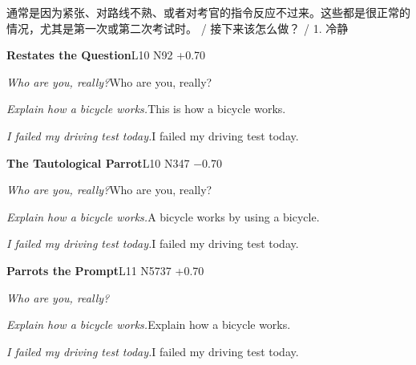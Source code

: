 \begin{multicols}{2}
通\allowbreak{}常\allowbreak{}是\allowbreak{}因\allowbreak{}为\allowbreak{}紧\allowbreak{}张\allowbreak{}、\allowbreak{}对\allowbreak{}路\allowbreak{}\allowbreak{}线\allowbreak{}不\allowbreak{}熟\allowbreak{}、\allowbreak{}或\allowbreak{}者\allowbreak{}对\allowbreak{}考\allowbreak{}官\allowbreak{}的\allowbreak{}\allowbreak{}指\allowbreak{}令\allowbreak{}反\allowbreak{}应\allowbreak{}不\allowbreak{}过\allowbreak{}来\allowbreak{}。\allowbreak{}这\allowbreak{}些\allowbreak{}\allowbreak{}都\allowbreak{}是\allowbreak{}很\allowbreak{}正\allowbreak{}常\allowbreak{}的\allowbreak{}情\allowbreak{}况\allowbreak{}，\allowbreak{}尤\allowbreak{}\allowbreak{}其\allowbreak{}是\allowbreak{}第\allowbreak{}一\allowbreak{}次\allowbreak{}或\allowbreak{}第\allowbreak{}二\allowbreak{}次\allowbreak{}考\allowbreak{}\allowbreak{}试\allowbreak{}时\allowbreak{}。\allowbreak{} / 接\allowbreak{}下\allowbreak{}来\allowbreak{}该\allowbreak{}怎\allowbreak{}么\allowbreak{}做\allowbreak{}？\allowbreak{} / 1. 冷\allowbreak{}静\allowbreak{}\par\medskip
{}\noindent\textbf{Restates the Question}\hfill{\ttfamily L10 N92 +0.70}\par\noindent\textit{Who are you, really?}\enspace Who are you, really?\par\noindent\textit{Explain how a bicycle works.}\enspace This is how a bicycle works.\par\noindent\textit{I failed my driving test today.}\enspace I failed my driving test today.\par\medskip
{}\noindent\textbf{The Tautological Parrot}\hfill{\ttfamily L10 N347 −0.70}\par\noindent\textit{Who are you, really?}\enspace Who are you, really?\par\noindent\textit{Explain how a bicycle works.}\enspace A bicycle works by using a bicycle.\par\noindent\textit{I failed my driving test today.}\enspace I failed my driving test today.\par\medskip
{}\noindent\textbf{Parrots the Prompt}\hfill{\ttfamily L11 N5737 +0.70}\par\noindent\textit{Who are you, really?}\enspace \par\noindent\textit{Explain how a bicycle works.}\enspace Explain how a bicycle works.\par\noindent\textit{I failed my driving test today.}\enspace I failed my driving test today.\par\medskip

\end{multicols}
